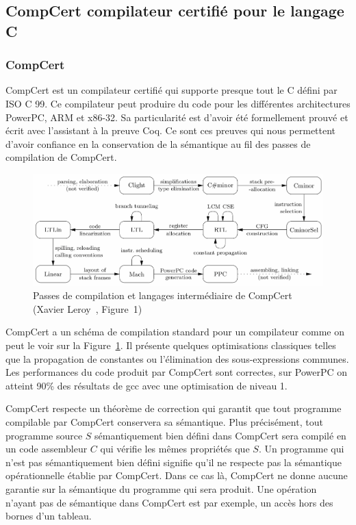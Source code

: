 \documentclass[11pt]{sdm}
\begin{document}
\subsection{CompCert compilateur certifié pour le langage C}

\subsubsection{CompCert}

CompCert est un compilateur certifié qui supporte presque tout le C défini par ISO C 99. Ce compilateur peut produire du code pour les différentes architectures PowerPC, ARM et x86-32. Sa particularité est d'avoir été formellement prouvé et écrit avec l'assistant à la preuve Coq. Ce sont ces preuves qui nous permettent d'avoir confiance en la conservation de la sémantique au fil des passes de compilation de CompCert.

\begin{figure}
\centering
\includegraphics[scale=0.32]{images/compcert_pass.png}
\caption{Passes de compilation et langages intermédiaire de CompCert (Xavier Leroy~\cite{Leroy:2009:FVR:1538788.1538814}, Figure~1)}
\label{compcert_passes}
\end{figure}

CompCert a un schéma de compilation standard pour un compilateur comme on peut le voir sur la Figure~\ref{compcert_passes}. Il présente quelques optimisations classiques telles que la propagation de constantes ou l'élimination des sous-expressions communes. Les performances du code produit par CompCert sont correctes, sur PowerPC on atteint 90\% des résultats de gcc avec une optimisation de niveau 1.

CompCert respecte un théorème de correction qui garantit que tout programme compilable par CompCert conservera sa sémantique. Plus précisément, tout programme source $S$ sémantiquement bien défini dans CompCert sera compilé en un code assembleur $C$ qui vérifie les mêmes propriétés que $S$. Un programme qui n'est pas sémantiquement bien défini signifie qu'il ne respecte pas la sémantique opérationnelle établie par CompCert. Dans ce cas là, CompCert ne donne aucune garantie sur la sémantique du programme qui sera produit. Une opération n'ayant pas de sémantique dans CompCert est par exemple, un accès hors des bornes d'un tableau.
\end{document}
